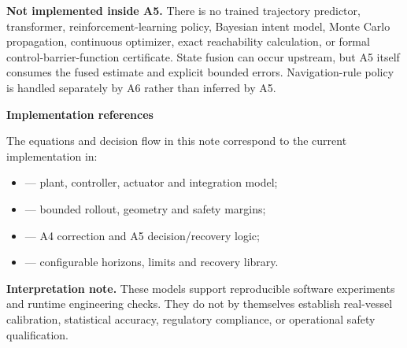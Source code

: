 \documentclass[10pt,a4paper]{article}
\newcommand{\sectionbar}[1]{%
  \vspace{4pt}%
  {\large\bfseries\color{hnavy}#1}\par
  \vspace{-2pt}{\color{hblue}\rule{\textwidth}{0.7pt}}\vspace{2pt}%
}
\newcommand{\modelbox}[1]{%
  \begingroup\setlength{\fboxsep}{8pt}%
  \colorbox{hpale}{\parbox{\dimexpr\textwidth-2\fboxsep\relax}{#1}}%
  \endgroup
}
\begin{document}
\modelbox{\textbf{Not implemented inside A5.} There is no trained trajectory predictor, transformer, reinforcement-learning policy, Bayesian intent model, Monte Carlo propagation, continuous optimizer, exact reachability calculation, or formal control-barrier-function certificate. State fusion can occur upstream, but A5 itself consumes the fused estimate and explicit bounded errors. Navigation-rule policy is handled separately by A6 rather than inferred by A5.}

\sectionbar{Implementation references}

The equations and decision flow in this note correspond to the current implementation in:
\begin{itemize}
  \item {} --- plant, controller, actuator and integration model;
  \item {} --- bounded rollout, geometry and safety margins;
  \item {} --- A4 correction and A5 decision/recovery logic;
  \item {} --- configurable horizons, limits and recovery library.
\end{itemize}

{\footnotesize\color{hgray}\textbf{Interpretation note.} These models support reproducible software experiments and runtime engineering checks. They do not by themselves establish real-vessel calibration, statistical accuracy, regulatory compliance, or operational safety qualification.}
\end{document}
